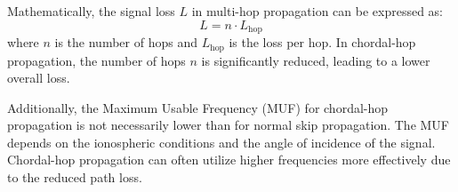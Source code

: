 Mathematically, the signal loss \( L \) in multi-hop propagation can be expressed as:
\[ L = n \cdot L_{\text{hop}} \]
where \( n \) is the number of hops and \( L_{\text{hop}} \) is the loss per hop. In chordal-hop propagation, the number of hops \( n \) is significantly reduced, leading to a lower overall loss.

Additionally, the Maximum Usable Frequency (MUF) for chordal-hop propagation is not necessarily lower than for normal skip propagation. The MUF depends on the ionospheric conditions and the angle of incidence of the signal. Chordal-hop propagation can often utilize higher frequencies more effectively due to the reduced path loss.

